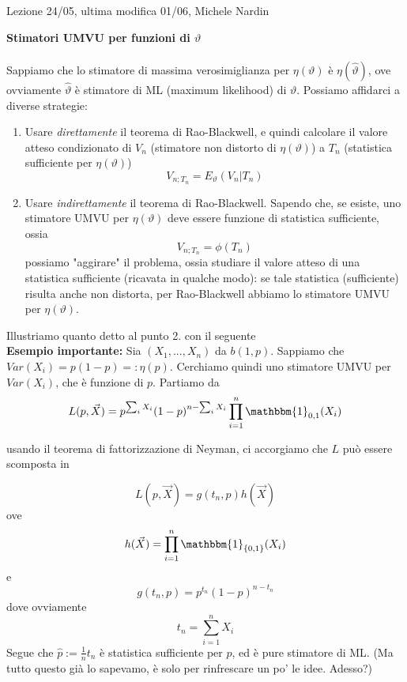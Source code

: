 \noindent Lezione 24/05, ultima modifica 01/06, Michele Nardin

\noindent \textbf{Stimatori UMVU per funzioni di $\vartheta$}\\
\\
Sappiamo che lo stimatore di massima verosimiglianza per $\eta(\vartheta)$ è $\eta(\hat{\vartheta})$, ove ovviamente $\hat{\vartheta}$ è stimatore di ML (maximum likelihood) di $\vartheta$. Possiamo affidarci a diverse strategie:
\begin{enumerate}
\item Usare \textit{direttamente} il teorema di Rao-Blackwell, e quindi calcolare il valore atteso condizionato di $V_n$ (stimatore non distorto di $\eta(\vartheta)$) a $T_n$ (statistica sufficiente per $\eta(\vartheta)$)
$$V_{n;T_n} = E_\vartheta(V_n|T_n)$$

\item  Usare \textit{indirettamente} il teorema di Rao-Blackwell. Sapendo che, se esiste, uno stimatore UMVU per $\eta(\vartheta)$ deve essere funzione di statistica sufficiente, ossia 
$$V_{n;T_n} = \phi(T_n)$$ possiamo "aggirare" il problema, 
ossia studiare il valore atteso di una statistica sufficiente (ricavata in qualche modo): se tale statistica (sufficiente) risulta anche non distorta, per Rao-Blackwell abbiamo lo stimatore UMVU per $\eta(\vartheta)$. 
\end{enumerate}
Illustriamo quanto detto al punto 2. con il seguente\\
\textbf{Esempio importante:} Sia $(X_1,...,X_n)$ da $b(1,p)$. Sappiamo che $Var(X_i) = p(1-p) =: \eta(p)$. Cerchiamo quindi uno stimatore UMVU per $Var(X_i)$, che è funzione di $p$.
Partiamo da 
$$L(p,\vec{X}) = p^{\sum_i X_i} (1-p)^{n - \sum_i X_i} \prod_{i=1}^n \mathbbm{1}_{0,1}(X_i)$$

usando il teorema di fattorizzazione di Neyman, ci accorgiamo che $L$ può essere scomposta in

$$L(p,\vec{X}) = g(t_n,p)h(\vec{X})$$ ove 
$$h(\vec{X}) = \prod_{i=1}^n \mathbbm{1}_{\{0,1\}}(X_i)$$
 e 
 $$g(t_n,p) = p^{t_n} (1-p)^{n - t_n}$$
  dove ovviamente 
  $$t_n = \sum_{i=1}^n X_i$$
Segue che $\hat{p}:=\frac{1}{n} t_n$ è statistica sufficiente per $p$, ed è pure stimatore di ML. (Ma tutto questo già lo sapevamo, è solo per rinfrescare un po' le idee. Adesso?)

